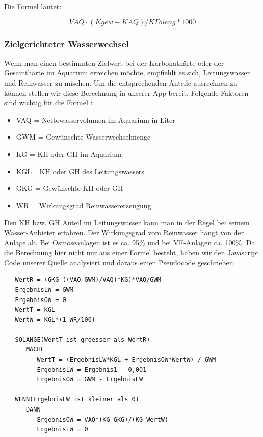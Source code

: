 Die Formel lautet:

\begin{equation}
VAQ\cdot(Kgew-KAQ)/KDueng*1000
\end{equation}

\subsubsection{Zielgerichteter Wasserwechsel}

Wenn man einen bestimmten Zielwert bei der Karbonathärte oder der Gesamthärte im Aquarium erreichen möchte, empfiehlt es sich, Leitungswasser und Reinwasser zu mischen. Um die entsprechenden Anteile ausrechnen zu können stellen wir diese Berechnung in unserer App bereit. Folgende Faktoren sind wichtig für die Formel \autocite{Formel:Wasserwechsel}:

\begin{itemize}
\item VAQ = Nettowasservolumen im Aquarium in Liter
\item GWM = Gewünschte Wasserwechselmenge
\item KG = KH oder GH im Aquarium
\item KGL= KH oder GH des Leitungswassers
\item GKG = Gewünschte KH oder GH
\item WR = Wirkungsgrad Reinwassererzeugung
\end{itemize}

Den KH bzw. GH Anteil im Leitungswasser kann man in der Regel bei seinem Wasser-Anbieter erfahren. Der Wirkungsgrad vom Reinwasser hängt von der Anlage ab. Bei Osmoseanlagen ist es ca. 95\% und bei VE-Anlagen ca. 100\%. Da die Berechnung hier nicht nur aus einer Formel besteht, haben wir den Javascript Code unserer Quelle \autocite{Formel:Wasserwechsel} analysiert und daraus einen Pseudocode geschrieben:

\begin{lstlisting}
   WertR = (GKG-((VAQ-GWM)/VAQ)*KG)*VAQ/GWM
   ErgebnisLW = GWM
   ErgebnisOW = 0
   WertT = KGL
   WertW = KGL*(1-WR/100)
   
   SOLANGE(WertT ist groesser als WertR)
      MACHE
         WertT = (ErgebnisLW*KGL + ErgebnisOW*WertW) / GWM
         ErgebnisLW = Ergebnis1 - 0,001
         ErgebnisOW = GWM - ErgebnisLW

   WENN(ErgebnisLW ist kleiner als 0)
      DANN
         ErgebnisOW = VAQ*(KG-GKG)/(KG-WertW)
         ErgebnisLW = 0
\end{lstlisting}

